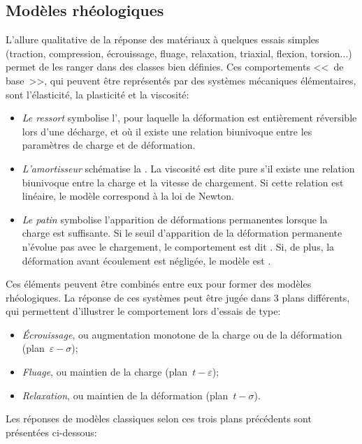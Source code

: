\subsection{Modèles rhéologiques}
L'allure qualitative de la réponse des matériaux à quelques essais simples (traction, compression,
écrouissage, fluage, relaxation, triaxial, flexion, torsion...) permet de les ranger dans des classes bien
définies.
Ces comportements <<~de base~>>, qui peuvent être représentés par des systèmes mécaniques
élémentaires, sont l'élasticité, la plasticité et la viscosité:
\begin{itemize}
  \item \emph{Le ressort} symbolise l', pour laquelle la
	déformation est entièrement réversible lors d'une décharge, et où il existe une relation
	biunivoque entre les paramètres de charge et de déformation.
  \item \emph{L'amortisseur} schématise la .
	La viscosité est dite pure s'il existe une relation biunivoque entre la charge et la vitesse de chargement.
	Si cette relation est linéaire, 	le modèle correspond à la loi de Newton.
  \item \emph{Le patin} symbolise l'apparition de déformations permanentes lorsque la
	charge est suffisante.
	Si le seuil d'apparition de la déformation permanente n'évolue pas avec le chargement, le
	comportement est dit .
	Si, de plus, la déformation avant écoulement est négligée, le modèle est
	.
\end{itemize}
\medskipvm
Ces éléments peuvent être combinés entre eux pour former des modèles rhéologiques.
La réponse de ces systèmes peut être jugée dans 3 plans différents, qui permettent d'illustrer le
comportement lors d'essais de type:
\begin{itemize}
  \item \emph{Écrouissage}, ou augmentation monotone de la charge ou de la déformation
	(plan~$\varepsilon-\sigma$);
  \item \emph{Fluage}, ou maintien de la charge (plan~$t-\varepsilon$);
  \item \emph{Relaxation}, ou maintien de la déformation (plan~$t-\sigma$).
\end{itemize}
\medskipvm
Les réponses de modèles classiques selon ces trois plans précédents sont présentées ci-dessous:
